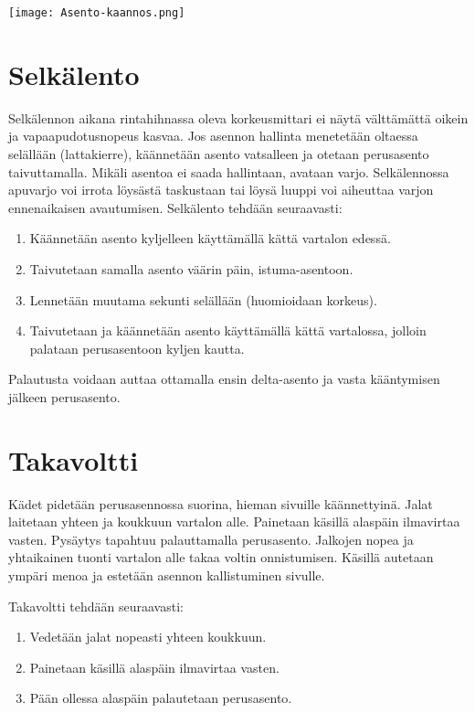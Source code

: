 \begin{Figure}\centering\texttt{[image: Asento-kaannos.png]}\end{Figure} 

\section{ Selkälento }
\label{perusliikkeet-vapaassa-selkalento}


Selkälennon aikana rintahihnassa oleva korkeusmittari ei näytä välttämättä oikein ja vapaapudotusnopeus kasvaa. Jos asennon hallinta menetetään oltaessa selällään (lattakierre), käännetään asento vatsalleen ja otetaan perusasento taivuttamalla. Mikäli asentoa ei saada hallintaan, avataan varjo. Selkälennossa apuvarjo voi irrota löysästä taskustaan tai löysä luuppi voi aiheuttaa varjon ennenaikaisen avautumisen. Selkälento tehdään seuraavasti: 

\begin{enumerate}[label=\bfseries \arabic*)]
\item  Käännetään asento kyljelleen käyttämällä kättä vartalon edessä. 
\item  Taivutetaan samalla asento väärin päin, istuma-asentoon. 
\item  Lennetään muutama sekunti selällään (huomioidaan korkeus). 
\item  Taivutetaan ja käännetään asento käyttämällä kättä vartalossa, jolloin palataan perusasentoon kyljen kautta. 
\end{enumerate}

Palautusta voidaan auttaa ottamalla ensin delta-asento ja vasta kääntymisen jälkeen perusasento. 

\section{ Takavoltti }
\label{perusliikkeet-vapaassa-takavoltti}


Kädet pidetään perusasennossa suorina, hieman sivuille käännettyinä. Jalat laitetaan yhteen ja koukkuun vartalon alle. Painetaan käsillä alaspäin ilmavirtaa vasten. Pysäytys tapahtuu palauttamalla perusasento. Jalkojen nopea ja yhtaikainen tuonti vartalon alle takaa voltin onnistumisen. Käsillä autetaan ympäri menoa ja estetään asennon kallistuminen sivulle. 


Takavoltti tehdään seuraavasti: 

\begin{enumerate}[label=\bfseries \arabic*)]
\item  Vedetään jalat nopeasti yhteen koukkuun. 
\item  Painetaan käsillä alaspäin ilmavirtaa vasten. 
\item  Pään ollessa alaspäin palautetaan perusasento. 
\end{enumerate}

